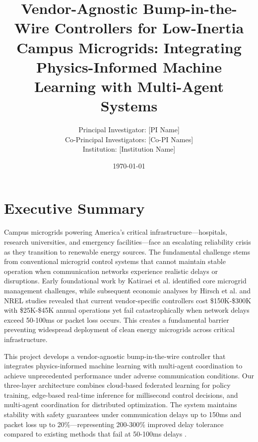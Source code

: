 \documentclass[12pt]{article}
\begin{document}
\title{\Large\textbf{Vendor-Agnostic Bump-in-the-Wire Controllers for Low-Inertia Campus Microgrids: Integrating Physics-Informed Machine Learning with Multi-Agent Systems}}


\author{Principal Investigator: [PI Name]\\
Co-Principal Investigators: [Co-PI Names]\\
Institution: [Institution Name]}

\date{\today}

\maketitle

\section{Executive Summary}

Campus microgrids powering America's critical infrastructure---hospitals, research universities, and emergency facilities---face an escalating reliability crisis as they transition to renewable energy sources. The fundamental challenge stems from conventional microgrid control systems that cannot maintain stable operation when communication networks experience realistic delays or disruptions. Early foundational work by Katiraei et al. \cite{katiraei2008} identified core microgrid management challenges, while subsequent economic analyses by Hirsch et al. \cite{hirsch2018} and NREL studies \cite{sigrin2019} revealed that current vendor-specific controllers cost \$150K-\$300K with \$25K-\$45K annual operations yet fail catastrophically when network delays exceed 50-100ms or packet loss occurs. This creates a fundamental barrier preventing widespread deployment of clean energy microgrids across critical infrastructure.

This project develops a vendor-agnostic bump-in-the-wire controller that integrates physics-informed machine learning with multi-agent coordination to achieve unprecedented performance under adverse communication conditions. Our three-layer architecture combines cloud-based federated learning for policy training, edge-based real-time inference for millisecond control decisions, and multi-agent coordination for distributed optimization. The system maintains stability with safety guarantees under communication delays up to 150ms and packet loss up to 20\%—representing 200-300\% improved delay tolerance compared to existing methods that fail at 50-100ms delays \cite{baseline2023delay}.
\end{document}

